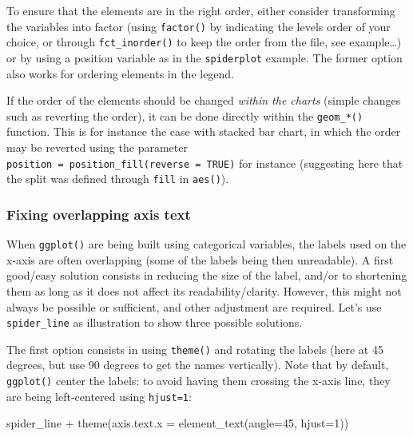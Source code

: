 \documentclass[
]{book}
\newenvironment{Shaded}{\begin{snugshade}}{\end{snugshade}}
\newcommand{\AttributeTok}[1]{\textcolor[rgb]{0.77,0.63,0.00}{#1}}
\newcommand{\DecValTok}[1]{\textcolor[rgb]{0.00,0.00,0.81}{#1}}
\newcommand{\FunctionTok}[1]{\textcolor[rgb]{0.00,0.00,0.00}{#1}}
\newcommand{\NormalTok}[1]{#1}
\newcommand{\SpecialCharTok}[1]{\textcolor[rgb]{0.00,0.00,0.00}{#1}}
\begin{document}
To ensure that the elements are in the right order, either consider transforming the variables into factor (using \texttt{factor()} by indicating the levels order of your choice, or through \texttt{fct\_inorder()} to keep the order from the file, see example\ldots) or by using a position variable as in the \texttt{spiderplot} example. The former option also works for ordering elements in the legend.

If the order of the elements should be changed \emph{within the charts} (simple changes such as reverting the order), it can be done directly within the \texttt{geom\_*()} function. This is for instance the case with stacked bar chart, in which the order may be reverted using the parameter \texttt{position\ =\ position\_fill(reverse\ =\ TRUE)} for instance (suggesting here that the split was defined through \texttt{fill} in \texttt{aes()}).

\hypertarget{fixing-overlapping-axis-text}{%
\subsubsection{Fixing overlapping axis text}\label{fixing-overlapping-axis-text}}

When \texttt{ggplot()} are being built using categorical variables, the labels used on the x-axis are often overlapping (some of the labels being then unreadable). A first good/easy solution consists in reducing the size of the label, and/or to shortening them as long as it does not affect its readability/clarity. However, this might not always be possible or sufficient, and other adjustment are required. Let's use \texttt{spider\_line} as illustration to show three possible solutions.

The first option consists in using \texttt{theme()} and rotating the labels (here at 45 degrees, but use 90 degrees to get the names vertically). Note that by default, \texttt{ggplot()} center the labels: to avoid having them crossing the x-axis line, they are being left-centered using \texttt{hjust=1}:

\begin{Shaded}
\begin{Highlighting}[]
\NormalTok{spider\_line }\SpecialCharTok{+} 
  \FunctionTok{theme}\NormalTok{(}\AttributeTok{axis.text.x =} \FunctionTok{element\_text}\NormalTok{(}\AttributeTok{angle=}\DecValTok{45}\NormalTok{, }\AttributeTok{hjust=}\DecValTok{1}\NormalTok{))}
\end{Highlighting}
\end{Shaded}
\end{document}
